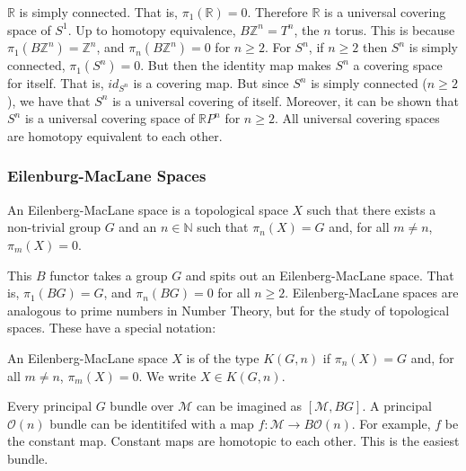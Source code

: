             $\mathbb{R}$ is simply connected. That is,
            $\pi_{1}(\mathbb{R})=0$. Therefore $\mathbb{R}$ is a
            universal covering space of $S^{1}$. Up to homotopy equivalence,
            $B\mathbb{Z}^{n}=T^{n}$, the $n$ torus. This is because
            $\pi_{1}(B\mathbb{Z}^{n})=\mathbb{Z}^{n}$, and
            $\pi_{n}(B\mathbb{Z}^{n})=0$ for $n\geq{2}$.
            For $S^{n}$, if $n\geq{2}$ then $S^{n}$ is simply connected,
            $\pi_{1}(S^{n})=0$. But then the identity map makes
            $S^{n}$ a covering space for itself. That is,
            $id_{S^{n}}$ is a covering map. But since $S^{n}$ is
            simply connected ($n\geq{2}$), we have that
            $S^{n}$ is a universal covering of itself.
            Moreover, it can be shown that
            $S^{n}$ is a universal covering space of
            $\mathbb{R}P^{n}$ for $n\geq{2}$.
            All universal covering spaces are homotopy
            equivalent to each other.
        \subsubsection{Eilenburg-MacLane Spaces}
            \begin{definition}
                An Eilenberg-MacLane space is a topological space
                $X$ such that there exists a non-trivial group
                $G$ and an $n\in\mathbb{N}$ such that
                $\pi_{n}(X)=G$ and, for all $m\ne{n}$,
                $\pi_{m}(X)=0$.
            \end{definition}
            This $B$ functor takes a group $G$ and spits out
            an Eilenberg-MacLane space. That is,
            $\pi_{1}(BG)=G$, and $\pi_{n}(BG)=0$ for all
            $n\geq{2}$. Eilenberg-MacLane spaces are analogous to
            prime numbers in Number Theory, but for the
            study of topological spaces. These have a
            special notation:
            \begin{fnotation}{}{}
                An Eilenberg-MacLane space $X$ is of the type
                $K(G,n)$ if $\pi_{n}(X)=G$ and, for all
                $m\ne{n}$, $\pi_{m}(X)=0$. We write
                $X\in{K(G,n)}$.
            \end{fnotation}
            Every principal $G$ bundle over $\mathcal{M}$
            can be imagined as $[\mathcal{M},BG]$.
            A principal $\mathcal{O}(n)$ bundle can be
            identitifed with a map
            $f:\mathcal{M}\rightarrow{B}\mathcal{O}(n)$.
            For example, $f$ be the constant map.
            Constant maps are homotopic to each other. This
            is the easiest bundle.
